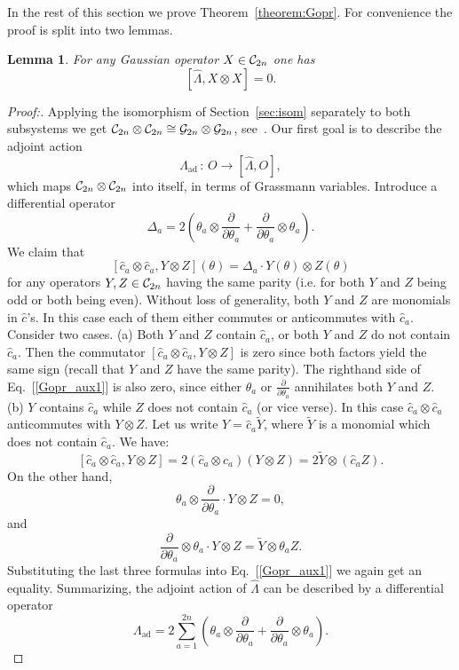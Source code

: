 \documentclass[twocolumn,showpacs,preprintnumbers,superscriptaddress]{revtex4}
\newtheorem{lemma}{Lemma}
\newcommand{\Clif}{{\cal C}}
\newcommand{\Gr}{{\cal G}}
\newcommand{\drv}[1]{\frac{\partial}{\partial{#1}}}
\newcommand{\ad}{{\mathrm{ad}}}
\newcommand{\be}{\begin{equation}}
\newcommand{\ee}{\end{equation}}
\newcommand{\cop}{{\hat{c}}}
\newcommand{\Lop}{{\hat{\Lambda}}}
\begin{document}
In the rest of this section we prove Theorem~\ref{theorem:Gopr}.
For convenience the proof is split into two lemmas.


\begin{lemma}\label{lemma:Gopr1}
For any Gaussian operator $X\in \Clif_{2n}$ one has
\be\label{Gopr1}
[\Lop,X\otimes X]=0.
\ee
\end{lemma}
\begin{proof}[Proof:]
Applying the isomorphism of Section~\ref{sec:isom} separately to
both subsystems 
we get 
$\Clif_{2n}\otimes\Clif_{2n}\cong \Gr_{2n}\otimes \Gr_{2n}$,
see~\cite{comment1}. 
Our first goal is to describe the adjoint action 
\[
\Lambda_{\ad}\, : \, O \to [\Lop, O],
\]
which maps $\Clif_{2n}\otimes\Clif_{2n}$ into itself,
in terms of Grassmann variables. Introduce a differential operator
\[
\Delta_a = 2\left( 
\theta_a\otimes \drv{\theta_a} + \drv{\theta_a}\otimes \theta_a\right).
\]
We claim that 
\be\label{Gopr_aux1}
[\cop_a\otimes \cop_a,Y\otimes Z](\theta)=\Delta_a \cdot Y(\theta)\otimes Z(\theta)
\ee
for any operators $Y,Z\in \Clif_{2n}$ having the same parity
(i.e. for both $Y$ and $Z$ being odd or both being even).
Without loss of generality, both $Y$ and $Z$ are monomials in $\cop$'s.
In this case each of them either commutes or anticommutes with $\cop_a$.
Consider two cases. (a) Both $Y$ and $Z$ contain $\cop_a$,
or both $Y$ and $Z$ do not contain
$\cop_a$.  Then the commutator $[\cop_a\otimes \cop_a,Y\otimes Z]$ is zero
since both factors yield the same sign (recall that $Y$ and $Z$ have the
same parity). The righthand side of Eq.~[\ref{Gopr_aux1}] is also zero,
since either $\theta_a$ or $\drv{\theta_a}$ annihilates both $Y$ and $Z$.
(b) $Y$ contains $\cop_a$ while $Z$ does not contain $\cop_a$ (or vice verse).
In this case $\cop_a\otimes\cop_a$ anticommutes with $Y\otimes Z$.
Let us write $Y=\cop_a \tilde{Y}$, where $\tilde{Y}$ is a monomial which does not
contain $\cop_a$. We have:
\[
[\cop_a\otimes \cop_a,Y\otimes Z]=2(\cop_a\otimes \cop_a)(Y\otimes Z) = 2\tilde{Y}\otimes
(\cop_a Z).
\]
On the other hand,
\[
\theta_a\otimes \drv{\theta_a} \cdot Y \otimes Z =0,
\]
and
\[
\drv{\theta_a}\otimes \theta_a \cdot Y\otimes Z =
\tilde{Y}\otimes \theta_a Z.
\]
Substituting the last three formulas into Eq.~[\ref{Gopr_aux1}] we again get an equality.
Summarizing, the adjoint action of $\Lop$ can be described by
a differential operator 
\be\label{Adjoint}
\Lambda_{\ad} = 2\sum_{a=1}^{2n}
\left( 
\theta_a\otimes \drv{\theta_a} + \drv{\theta_a}\otimes \theta_a
\right).
\ee


\end{proof}
\end{document}
